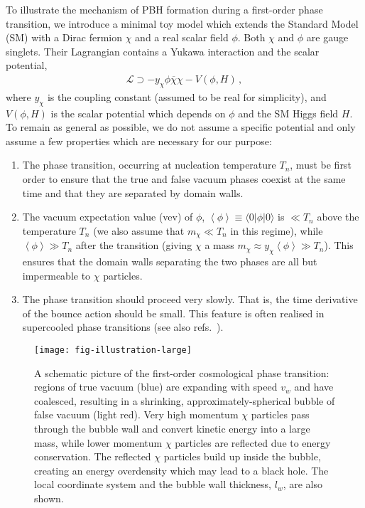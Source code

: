 \documentclass[
onecolumn, %
11pt, %
tightenlines,
superscriptaddress, %
nofootinbib, %
preprintnumbers, %
prd %
]{revtex4-1}
\newcommand{\bra}[1]{\ensuremath{\langle #1 |}}   %
\newcommand{\ket}[1]{\ensuremath{| #1 \rangle}}   %
\newcommand{\ev}[1]{\ensuremath{\left\langle #1 %
        \right\rangle}} %
\begin{document}
To illustrate the mechanism of PBH formation during a first-order phase transition, we introduce a minimal toy model which extends the Standard Model (SM) with a Dirac fermion $\chi$ and a real scalar field $\phi$. Both $\chi$ and $\phi$ are gauge singlets. Their Lagrangian contains a Yukawa interaction and the scalar potential,
%
\begin{align}
  \mathcal L \supset - y_\chi \phi\overline{\chi}{\chi} - V(\phi,H) \,,
  \label{eq:L}
\end{align}
%
where $y_\chi$ is the coupling constant (assumed to be real for simplicity), and $V(\phi,H)$ is the scalar potential which depends on $\phi$ and the SM Higgs field $H$. To remain as general as possible, we do not assume a specific potential and only assume a few properties which are necessary for our purpose:
%
\begin{enumerate}
    \item The phase transition, occurring at nucleation temperature $T_n$, must be first order to ensure that the true and false vacuum phases coexist at the same time and that they are separated by domain walls.
    
    \item The vacuum expectation value (vev) of $\phi$, $\ev{\phi} \equiv \bra{0}\phi\ket{0}$ is $\ll T_n$ above the temperature $T_n$ (we also assume that $m_\chi \ll T_n$ in this regime), while $\ev{\phi} \gg T_n$ after the transition (giving $\chi$ a mass $m_\chi \approx y_\chi\!\ev{\phi} \gg T_n$). This ensures that the domain walls separating the two phases are all but impermeable to $\chi$ particles.
    
    \item The phase transition should proceed very slowly.  That is, the time derivative of the bounce action should be small. This feature is often realised in supercooled phase transitions \cite{DelleRose:2019pgi} (see also refs.~\cite{Konstandin:2011dr, Jaeckel:2016jlh, Hambye:2018qjv}).
\end{enumerate}

\begin{figure}
    \centering
    \texttt{[image: fig-illustration-large]}
    \caption{
      A schematic picture of the first-order cosmological phase transition: regions of true vacuum (blue) are expanding with speed $v_w$ and have coalesced, resulting in a shrinking, approximately-spherical bubble of false vacuum (light red).  Very high momentum $\chi$ particles pass through the bubble wall and convert kinetic energy into a large mass, while lower momentum $\chi$ particles are reflected due to energy conservation.  The reflected $\chi$ particles build up inside the bubble, creating an energy overdensity which may lead to a black hole.  The local coordinate system and the bubble wall thickness, $l_w$, are also shown.}
    \label{fig:illustration}
\end{figure}
\end{document}
